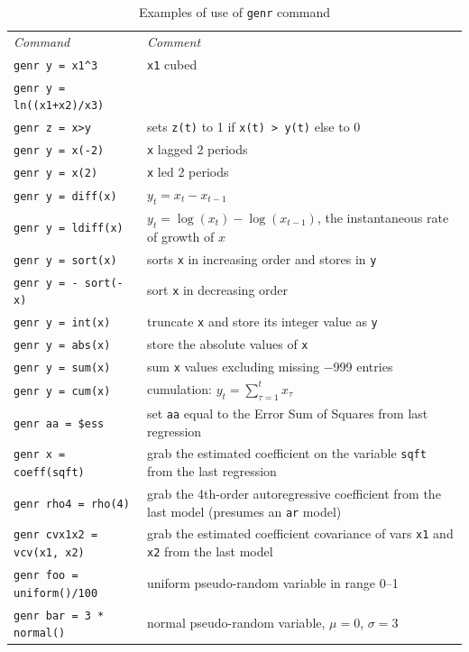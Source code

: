 \documentclass{article}
\begin{document}
{\begin{table}[hp]
\begin{center}
\begin{tabular}{lp{4in}}
\qquad \textit{Command} & 
\qquad \textit{Comment} \\ [6pt]
\verb+genr y = x1^3+ & \texttt{x1} cubed \\          
\texttt{genr y = ln((x1+x2)/x3)} & \\
\verb+genr z = x>y+ 
& sets \texttt{z(t)} to 1 if \verb+x(t) > y(t)+ else to 0 \\ 
\texttt{genr y = x(-2)} & \texttt{x} lagged 2 periods \\     
\texttt{genr y = x(2)}  & \texttt{x} led 2 periods \\
\texttt{genr y = diff(x)} & $y_t = x_t - x_{t-1}$ \\
\texttt{genr y = ldiff(x)} & $y_t = \log(x_t) - \log(x_{t-1})$, 
    the instantaneous rate of growth of $x$ \\
\texttt{genr y = sort(x)} & sorts \texttt{x} in increasing order 
    and stores in \texttt{y} \\
\texttt{genr y = - sort(-x)} & sort \texttt{x} in decreasing order \\
\texttt{genr y = int(x)} & truncate \texttt{x} and store its integer value
  as \texttt{y} \\
\texttt{genr y = abs(x)} & store the absolute values of \texttt{x} \\
\texttt{genr y = sum(x)} & sum \texttt{x} values excluding missing $-$999
entries \\
\texttt{genr y = cum(x)} & cumulation: $y_t = \sum_{\tau=1}^t
x_{\tau}$\\
\texttt{genr aa = \$ess} & set \texttt{aa} equal to the Error Sum of
Squares from last regression\\
\texttt{genr x = coeff(sqft)} & grab the estimated coefficient on the
variable \texttt{sqft} from the last regression\\
\texttt{genr rho4 = rho(4)} & grab the 4th-order autoregressive
coefficient from the last model (presumes an \texttt{ar} model) \\
\texttt{genr cvx1x2 = vcv(x1, x2)} & grab the estimated coefficient
covariance of vars \texttt{x1} and \texttt{x2} from the last model \\
\texttt{genr foo = uniform()/100} & uniform pseudo-random variable in
range 0--1 \\
\texttt{genr bar = 3 * normal()} & normal pseudo-random variable,
$\mu = 0$, $\sigma = 3$ 
\end{tabular}
\caption{Examples of use of \texttt{genr} command}
\label{tab:genr}
\end{center}
\end{table}

}
\end{document}
